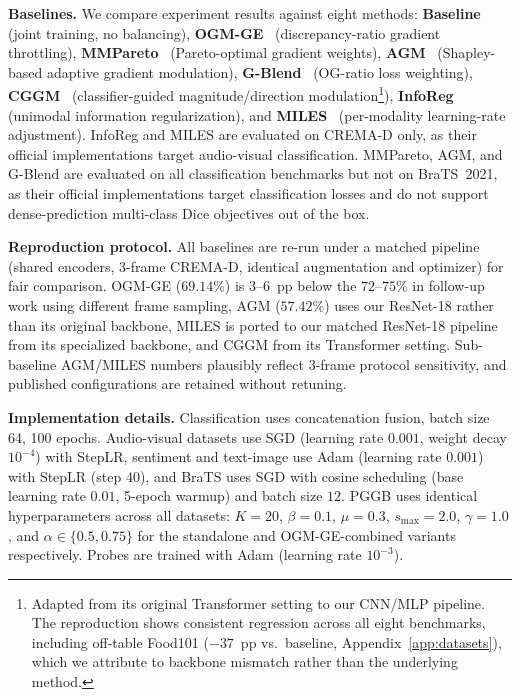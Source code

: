 \documentclass{article} %
\begin{document}
\textbf{Baselines.}
\label{sec:baselines}
We compare experiment results against eight methods: \textbf{Baseline} (joint training, no balancing), \textbf{OGM-GE}~\citep{peng2022ogmge} (discrepancy-ratio gradient throttling), \textbf{MMPareto}~\citep{wei2024mmpareto} (Pareto-optimal gradient weights), \textbf{AGM}~\citep{li2023agm} (Shapley-based adaptive gradient modulation), \textbf{G-Blend}~\citep{wang2020gblending} (OG-ratio loss weighting), \textbf{CGGM}~\citep{guo2024cggm} (classifier-guided magnitude/direction modulation\footnote{Adapted from its original Transformer setting to our CNN/MLP pipeline. The reproduction shows consistent regression across all eight benchmarks, including off-table Food101 ($-37$~pp vs.\ baseline, Appendix~\ref{app:datasets}), which we attribute to backbone mismatch rather than the underlying method.}), \textbf{InfoReg}~\citep{huang2025inforeg} (unimodal information regularization), and \textbf{MILES}~\citep{guerra2025miles} (per-modality learning-rate adjustment). InfoReg and MILES are evaluated on CREMA-D only, as their official implementations target audio-visual classification. MMPareto, AGM, and G-Blend are evaluated on all classification benchmarks but not on BraTS~2021, as their official implementations target classification losses and do not support dense-prediction multi-class Dice objectives out of the box.

\textbf{Reproduction protocol.} All baselines are re-run under a matched pipeline (shared encoders, 3-frame CREMA-D, identical augmentation and optimizer) for fair comparison. OGM-GE ($69.14\%$) is $3$--$6$~pp below the $72$--$75\%$ in follow-up work using different frame sampling, AGM ($57.42\%$) uses our ResNet-18 rather than its original backbone, MILES is ported to our matched ResNet-18 pipeline from its specialized backbone, and CGGM from its Transformer setting. Sub-baseline AGM/MILES numbers plausibly reflect 3-frame protocol sensitivity, and published configurations are retained without retuning.

\textbf{Implementation details.}
Classification uses concatenation fusion, batch size 64, 100 epochs. Audio-visual datasets use SGD (learning rate $0.001$, weight decay $10^{-4}$) with StepLR, sentiment and text-image use Adam (learning rate $0.001$) with StepLR (step $40$), and BraTS uses SGD with cosine scheduling (base learning rate $0.01$, 5-epoch warmup) and batch size $12$. PGGB uses identical hyperparameters across all datasets: $K{=}20$, $\beta{=}0.1$, $\mu{=}0.3$, $s_{\max}{=}2.0$, $\gamma{=}1.0$, and $\alpha \in \{0.5, 0.75\}$ for the standalone and OGM-GE-combined variants respectively. Probes are trained with Adam (learning rate $10^{-3}$).
\end{document}
